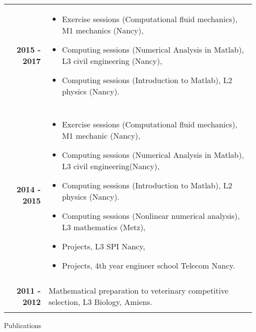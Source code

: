 \documentclass[10pt,a4paper]{report}
\begin{document}
\vspace{0.6cm}
\noindent
\begin{center}
\begin{tabular}{r p{12cm}}
\textbf{2015 - 2017} & \begin{itemize}
\item Exercise sessions (Computational fluid mechanics), M1 mechanics (Nancy),
\item Computing sessions (Numerical Analysis in Matlab), L3 civil engineering (Nancy),
\item Computing sessions (Introduction to Matlab), L2 physics (Nancy).
\end{itemize}\\

& \\

\textbf{2014 - 2015} & \begin{itemize}
\item Exercise sessions (Computational fluid mechanics), M1 mechanic (Nancy),
\item Computing sessions (Numerical Analysis in Matlab), L3 civil engineering(Nancy),
\item Computing sessions (Introduction to Matlab), L2 physics (Nancy).
\item Computing sessions (Nonlinear numerical analysis), L3 mathematics (Metz),
\item Projects, L3 SPI Nancy,
\item Projects, 4th year engineer school Telecom Nancy.
\end{itemize}\\

& \\

\textbf{2011 - 2012} & Mathematical preparation to veterinary competitive selection, L3 Biology, Amiens.\\

& \\
\end{tabular}
\end{center}

\newpage
\noindent
{\selectfont
\begin{Large}
Publications
\end{Large}
\hrulefill
}

\vspace{0.6cm}
\end{document}
